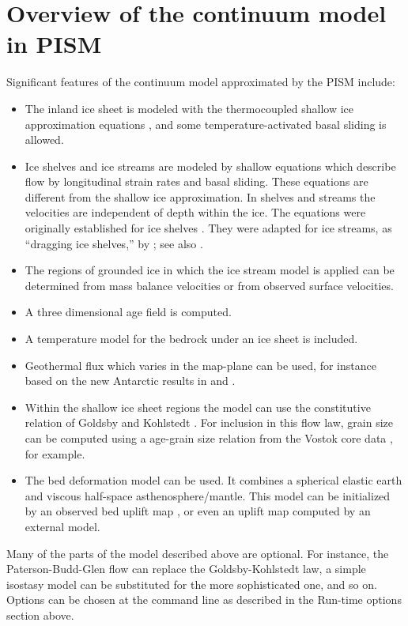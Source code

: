 \documentclass[11pt,final]{amsart}
\begin{document}
\section{Overview of the continuum model in PISM}
Significant features of the continuum model approximated by the PISM include:\begin{itemize}
\item The inland ice sheet is modeled with the thermocoupled shallow ice approximation equations \cite{Fowler}, and some temperature-activated basal sliding is allowed.
\item Ice shelves and ice streams are modeled by shallow equations which describe flow by longitudinal strain rates and basal sliding.  These equations are different from the shallow ice approximation.  In shelves and streams the velocities are independent of depth within the ice.  The equations were originally established for ice shelves \cite{Morland,MorlandZainuddin,MacAyealetal}.  They were adapted for ice streams, as ``dragging ice shelves,'' by \cite{MacAyeal}; see also \cite{HulbeMacAyeal}.
\item The regions of grounded ice in which the ice stream model is applied can be determined from mass balance velocities \cite{BamberVaughanJoughin} or from observed surface velocities.
\item A three dimensional age field is computed.
\item A temperature model for the bedrock under an ice sheet is included.
\item Geothermal flux which varies in the map-plane can be used, for instance based on the new Antarctic results in \cite{ShapiroRitzwoller} and \cite{FoxMaule}.
\item Within the shallow ice sheet regions the model can use the constitutive relation of Goldsby and Kohlstedt \cite{GoldsbyKohlstedt,Peltieretal}.  For inclusion in this flow law, grain size can be computed using a age-grain size relation from the Vostok core data \cite{VostokCore}, for example.
\item The \cite{LingleClark} bed deformation model can be used.  It combines a spherical elastic earth and viscous half-space asthenosphere/mantle.  This model can be initialized by an observed bed uplift map \cite{BLKfastearth}, or even an uplift map computed by an external model.\end{itemize}

Many of the parts of the model described above are optional.  For instance, the Paterson-Budd-Glen \cite{PatersonBudd} flow can replace the Goldsby-Kohlstedt law, a simple isostasy model can be substituted for the more sophisticated one, and so on.  Options can be chosen at the command line  as described in the Run-time options section above.
\end{document}
